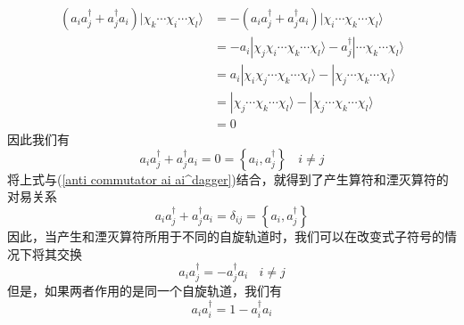 \documentclass[12pt,a4paper,openany,twoside]{book}
\numberwithin{equation}{section}
\begin{document}
      \begin{equation}
        \begin{aligned}\left(a_{i} a_{j}^{\dagger}+a_{j}^{\dagger} a_{i}\right) | \chi_{k} \cdots \chi_{i} \cdots \chi_{l} \rangle &=-\left(a_{i} a_{j}^{\dagger}+a_{j}^{\dagger} a_{i}\right) | \chi_{i} \cdots \chi_{k} \cdots \chi_{l} \rangle \\ &=-a_{i} | \chi_{j} \chi_{i} \cdots \chi_{k} \cdots \chi_{l} \rangle-a_{j}^{\dagger} | \cdots \chi_{k} \cdots \chi_{l} \rangle \\ &=a_{i} | \chi_{i} \chi_{j} \cdots \chi_{k} \cdots \chi_{l} \rangle-| \chi_{j} \cdots \chi_{k} \cdots \chi_{l} \rangle \\ &=| \chi_{j} \cdots \chi_{k} \cdots \chi_{l} \rangle-| \chi_{j} \cdots \chi_{k} \cdots \chi_{l} \rangle \\ &=0 \end{aligned}
      \end{equation}
      因此我们有
      \begin{equation}
          a_i a_j^\dagger+a_j^\dagger a_i=0=\left\{a_i,a_j^\dagger\right\}\ \ \ \ i\neq j
      \end{equation}
      将上式与(\ref{anti commutator ai ai^dagger})结合，就得到了产生算符和湮灭算符的对易关系
      \begin{equation}
          a_i a_j^\dagger+a_j^\dagger a_i=\delta_{ij}=\left\{a_i,a_j^\dagger\right\}
          \label{anti commutator creation and annihilation}
      \end{equation}
      因此，当产生和湮灭算符所用于不同的自旋轨道时，我们可以在改变式子符号的情况下将其交换
      \begin{equation}
          a_i a_j^\dagger=-a_j^\dagger a_i \ \ \ \ i\neq j
      \end{equation}
      但是，如果两者作用的是同一个自旋轨道，我们有
      \begin{equation}
          a_i a_i^\dagger=1-a_i^\dagger a_i
      \end{equation}
      
\end{document}

